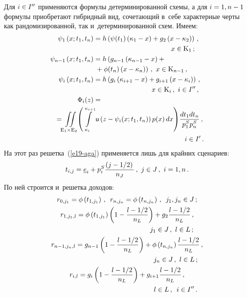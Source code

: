 \begin{multicols}{2}
  Для $i\hm\in I^{\prime\prime}$ применяются формулы детерминированной 
схемы, а для $i\hm = 1, n\hm-1$ формулы приобретают гибридный вид, 
сочетающий в~себе характерные черты как рандомизированной, так 
и~детерминированной схем. Имеем: 
  \begin{align*}
  \psi_1\left(x;t_1,t_n\right)& =h\left( \psi(t_1)\left( \kappa_1-x\right) +g_2\left( x-
\kappa_2\right)\right)\,,\\
&\hspace*{40mm}x\in \mathrm{K}_1\,;\\
  \psi_{n-1}\left( x; t_1, t_n\right) &=h\left( g_{n-1}\left( \kappa_{n-1}-x\right) 
+{}\right.\\
&\left.{}+\phi(t_n)\left( x-\kappa_n\right)\right)\,,\ x\in \mathrm{K}_{n-1}\,,\\
  \psi_i\left( x; t_1, t_n\right) &=h\left( g_i\left( \kappa_{i+1} -x\right) +g_{i+1} \left( 
x-\kappa_i\right)\right)\,,\\
&\hspace*{30mm} x\in \mathrm{K}_i\,,\ i\in I^{\prime\prime}\,,\\
  \Phi_i(z) &={}\\
&\hspace*{-20mm}{}=\iint\limits_{\mathrm{E}_1\times\mathrm{E}_2} \!\left(  
\int\limits_{\kappa_i}^{\kappa_{i+1}} {\sf u} \left( z-\psi_i(x; t_1,t_n)\right) 
p(x)\,dx\right)\! \fr{dt_1 dt_n}{p_1^S p_n^S}\,,\\
&\hspace*{47mm} i\in I^\prime\,.
  \end{align*}
  На этот раз решетка~(\ref{e19-aga}) применяется лишь для крайних 
сценариев: 
  \begin{equation}
  t_{i,j} =\underline{e}_i+p_i^S\displaystyle\frac{\displaystyle \left( j-1/2\right)\mathstrut}{\displaystyle n_J\mathstrut}\,,\ j\in J\,,\ i=1,n\,.
  \label{e24-aga}
  \end{equation}
По ней строится и~решетка доходов: 
\begin{gather*}
r_{0,j_1} =\phi\left( t_{1,j_1}\right)\,,\enskip r_{n,j_n} =\phi\left( 
t_{n,j_n}\right)\,,\enskip  j_1, j_n\in J\,;\\
r_{1,j_1,l} =\phi \left( t_{1,j_1}\right) \left( 1- \fr{l-1/2}{n_L}\right) +g_2 \fr{l-
1/2}{n_L}\,,\\
 \hspace*{46mm}j_1\in J\,,\ l\in L\,;\\
r_{n-1, j_n, l} =g_{n-1} \left( 1-\fr{l-1/2}{n_L}\right) +\phi\left( t_{n,j_n}\right) 
\fr{l-1/2}{n_L}\,,\\
\hspace*{50mm} j_n\in J\,,\ l\in L\,;\\
r_{i,l} =g_i\left( 1-\fr{l-1/2}{n_L}\right) +g_{i+1} \fr{l-1/2}{n_L}\,,\\
 \hspace*{50mm}l\in  L\,,\enskip i\in I^{\prime\prime}\,.
\end{gather*}


\end{multicols}
